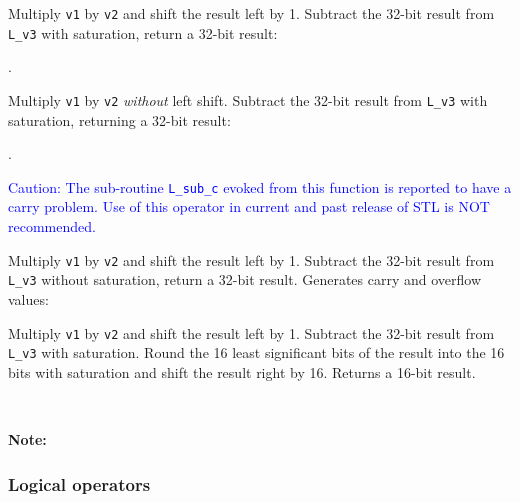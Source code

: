 Multiply {\tt v1} by {\tt v2} and shift the result left by 1. Subtract
the 32-bit result from {\tt L\_v3} with saturation, return a 32-bit
result:

.


Multiply {\tt v1} by {\tt v2} {\em without} left shift. Subtract the
32-bit result from {\tt L\_v3} with saturation, returning a 32-bit
result:

.


\textcolor{blue}{
%
  Caution: The sub-routine {\tt L\_sub\_c} evoked from this function
  is reported to have a carry problem. Use of this operator in current
  and past release of STL is NOT recommended.
%
}

Multiply {\tt v1} by {\tt v2} and shift the result left by 1. Subtract
the 32-bit result from {\tt L\_v3} without saturation, return a 32-bit
result. Generates carry and overflow values:




Multiply {\tt v1} by {\tt v2} and shift the result left by 1.
Subtract the 32-bit result from {\tt L\_v3} with saturation. Round
the 16 least significant bits of the result into the 16 bits with
saturation and shift the result right by 16. Returns a 16-bit
result.

\ \\

\textbf{Note:} \hfill {}

\subsubsection{Logical operators}

